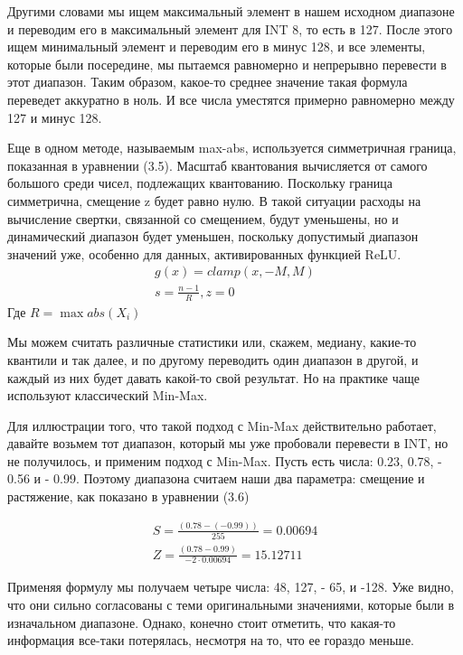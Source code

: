 \documentclass[oneside,final,12pt]{extreport}
\begin{document}
Другими словами мы ищем максимальный элемент в нашем исходном диапазоне и переводим его в максимальный элемент для INT 8, то есть в 127. После этого ищем минимальный элемент и переводим его в минус 128, и все элементы, которые были посередине, мы пытаемся равномерно и непрерывно перевести в этот диапазон. Таким образом, какое-то среднее значение такая формула переведет аккуратно в ноль. И все числа уместятся примерно равномерно между 127 и минус 128.

Еще в одном методе, называемым max-abs, используется симметричная граница, показанная в уравнении (3.5). Масштаб квантования вычисляется от самого большого среди чисел, подлежащих квантованию. Поскольку граница симметрична,  смещение z будет равно нулю. В такой ситуации расходы на вычисление свертки, связанной со смещением, будут уменьшены, но и динамический диапазон будет уменьшен, поскольку допустимый диапазон значений уже, особенно для данных, активированных функцией ReLU.
\begin{equation}
\begin{split}
g(x)=clamp(x,-M,M)\\
s=\frac{n-1}{R}, z=0
\end{split}
\end{equation}
Где $R=\max{abs(X_i)}$

Мы можем считать различные статистики или, скажем, медиану, какие-то квантили и так далее, и по другому переводить один диапазон в другой, и каждый из них будет давать какой-то свой результат. Но на практике чаще используют классический Min-Max.

Для иллюстрации того, что такой подход с Min-Max действительно работает, давайте возьмем тот диапазон, который мы уже пробовали перевести в INT, но не получилось, и применим подход с Min-Max. Пусть есть числа: 0.23, 0.78, - 0.56 и - 0.99. 
Поэтому диапазона считаем наши два параметра: смещение и растяжение, как показано в уравнении (3.6)

\begin{equation}
\begin{split}
S=\frac{(0.78-(-0.99))}{255}=0.00694\\
Z=\frac{(0.78-0.99)}{-2\cdot 0.00694}=15.12711
\end{split}
\end{equation}

Применяя формулу мы получаем четыре числа: 48, 127, - 65, и -128. Уже видно, что они сильно согласованы с теми оригинальными значениями, которые были в изначальном диапазоне. Однако, конечно стоит отметить, что какая-то информация все-таки потерялась, несмотря на то, что ее гораздо меньше. 
\end{document}
